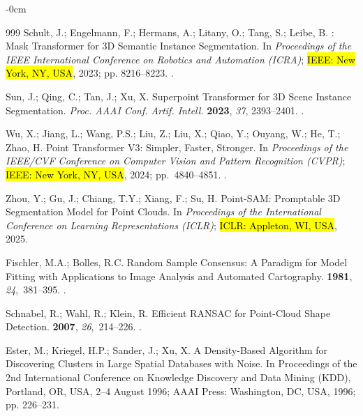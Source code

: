\documentclass[electronics,article,accept,pdftex,moreauthors]{Definitions/mdpi}
\begin{document}
\begin{adjustwidth}{-\extralength}{0cm}
\begin{thebibliography}{999}
Schult, J.; Engelmann, F.; Hermans, A.; Litany, O.; Tang, S.; Leibe, B.
: Mask Transformer for {3D} Semantic Instance Segmentation.
\newblock In \textit{Proceedings of the IEEE International Conference on Robotics and Automation
  (ICRA)}; \hl{IEEE: New York, NY, USA},  2023; pp. 8216--8223.
.

Sun, J.; Qing, C.; Tan, J.; Xu, X.
\newblock Superpoint Transformer for 3{D} Scene Instance Segmentation.
\newblock  \textit{Proc. AAAI Conf. Artif. Intell.}  \textbf{2023}, \textit{37},
  2393--2401.
.

Wu, X.; Jiang, L.; Wang, P.S.; Liu, Z.; Liu, X.; Qiao, Y.; Ouyang, W.; He, T.;
  Zhao, H.
\newblock Point Transformer {V}3: Simpler, Faster, Stronger.
\newblock In \textit{Proceedings of the IEEE/CVF Conference on Computer Vision and Pattern
  Recognition (CVPR)}; \hl{IEEE: New York, NY, USA},  2024; pp.~4840--4851.
.

Zhou, Y.; Gu, J.; Chiang, T.Y.; Xiang, F.; Su, H.
\newblock Point-SAM: Promptable 3D Segmentation Model for Point Clouds.
\newblock In \emph{Proceedings of the International Conference on Learning Representations (ICLR)}; \hl{ICLR: Appleton, WI, USA}, {2025}.

Fischler, M.A.; Bolles, R.C.
\newblock Random Sample Consensus: A Paradigm for Model Fitting with
  Applications to Image Analysis and Automated Cartography.
 {\bf 1981}, {\em 24},~381--395.
.

Schnabel, R.; Wahl, R.; Klein, R.
\newblock Efficient {RANSAC} for Point-Cloud Shape Detection.
 {\bf 2007}, {\em 26},~214--226.
.

Ester, M.; Kriegel, H.P.; Sander, J.; Xu, X.
\newblock A Density-Based Algorithm for Discovering Clusters in Large Spatial
  Databases with Noise.
\newblock In Proceedings of the 2nd International Conference on Knowledge Discovery and Data
  Mining (KDD),  Portland, OR, USA,   2–4 August 1996; AAAI Press: Washington, DC, USA, {1996}; pp. 226--231.



\end{thebibliography}
\end{adjustwidth}
\end{document}
